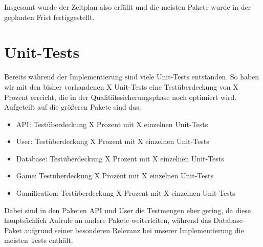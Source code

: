 \documentclass[a4paper]{scrreprt}
\begin{document}
\hspace{1cm}

Insgesamt wurde der Zeitplan also erfüllt und die meisten Pakete wurde in der geplanten Frist fertiggestellt.

\chapter{Unit-Tests}
Bereits während der Implementierung sind viele Unit-Tests entstanden. So haben wir mit den bisher vorhandenen X Unit-Tests eine Testüberdeckung von X Prozent erreicht, die in der Qualitätssicherungsphase noch optimiert wird. Aufgeteilt auf die größeren Pakete sind das:
\begin{itemize}
	\item API: Testüberdeckung X Prozent mit X einzelnen Unit-Tests
	\item User: Testüberdeckung X Prozent mit X einzelnen Unit-Tests
	\item Database: Testüberdeckung X Prozent mit X einzelnen Unit-Tests
	\item Game: Testüberdeckung X Prozent mit X einzelnen Unit-Tests
	\item Gamification: Testüberdeckung X Prozent mit X einzelnen Unit-Tests
\end{itemize}
\hspace{1cm}

Dabei sind in den Paketen API und User die Testmengen eher gering, da diese hauptsächlich Aufrufe an andere Pakete weiterleiten, während das Database-Paket aufgrund seiner besonderen Relevanz bei unserer Implementierung die meisten Tests enthält.

\end{document}
